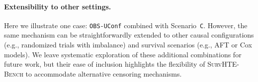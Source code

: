 \documentclass{article} %
\begin{document}
\paragraph{Extensibility to other settings.}
Here we illustrate one case: \texttt{OBS-UConf} combined with Scenario~\texttt{C}.  
However, the same mechanism can be straightforwardly extended to other causal configurations (e.g., randomized trials with imbalance) and survival scenarios (e.g., AFT or Cox models).  
We leave systematic exploration of these additional combinations for future work, but their ease of inclusion highlights the flexibility of \textsc{SurvHTE-Bench} to accommodate alternative censoring mechanisms.%



\end{document}
